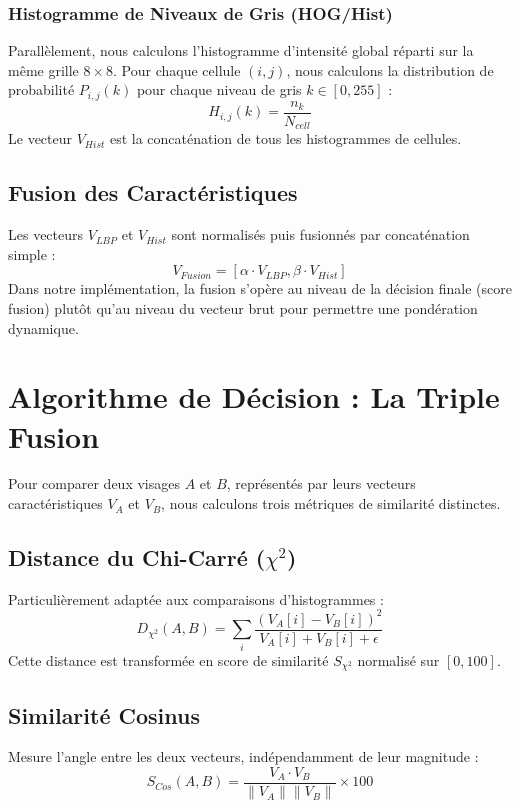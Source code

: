 \documentclass[a4paper,12pt]{article}
\begin{document}
\subsubsection{Histogramme de Niveaux de Gris (HOG/Hist)}
Parallèlement, nous calculons l'histogramme d'intensité global réparti sur la même grille $8 \times 8$. Pour chaque cellule $(i, j)$, nous calculons la distribution de probabilité $P_{i,j}(k)$ pour chaque niveau de gris $k \in [0, 255]$ :
\begin{equation}
H_{i,j}(k) = \frac{n_k}{N_{cell}}
\end{equation}
Le vecteur $V_{Hist}$ est la concaténation de tous les histogrammes de cellules.

\subsection{Fusion des Caractéristiques}
Les vecteurs $V_{LBP}$ et $V_{Hist}$ sont normalisés puis fusionnés par concaténation simple :
\begin{equation}
V_{Fusion} = [ \alpha \cdot V_{LBP}, \beta \cdot V_{Hist} ]
\end{equation}
Dans notre implémentation, la fusion s'opère au niveau de la décision finale (score fusion) plutôt qu'au niveau du vecteur brut pour permettre une pondération dynamique.

\section{Algorithme de Décision : La Triple Fusion}

Pour comparer deux visages $A$ et $B$, représentés par leurs vecteurs caractéristiques $V_A$ et $V_B$, nous calculons trois métriques de similarité distinctes.

\subsection{Distance du Chi-Carré ($\chi^2$)}
Particulièrement adaptée aux comparaisons d'histogrammes :
\begin{equation}
D_{\chi^2}(A, B) = \sum_{i} \frac{(V_A[i] - V_B[i])^2}{V_A[i] + V_B[i] + \epsilon}
\end{equation}
Cette distance est transformée en score de similarité $S_{\chi^2}$ normalisé sur $[0, 100]$.

\subsection{Similarité Cosinus}
Mesure l'angle entre les deux vecteurs, indépendamment de leur magnitude :
\begin{equation}
S_{Cos}(A, B) = \frac{V_A \cdot V_B}{\|V_A\| \|V_B\|} \times 100
\end{equation}
\end{document}
